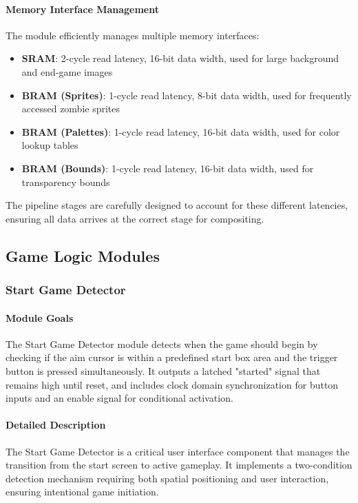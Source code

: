 \documentclass[12pt,a4paper]{article}
\begin{document}
\paragraph{Memory Interface Management}
The module efficiently manages multiple memory interfaces:
\begin{itemize}
    \item \textbf{SRAM}: 2-cycle read latency, 16-bit data width, used for large background and end-game images
    \item \textbf{BRAM (Sprites)}: 1-cycle read latency, 8-bit data width, used for frequently accessed zombie sprites
    \item \textbf{BRAM (Palettes)}: 1-cycle read latency, 16-bit data width, used for color lookup tables
    \item \textbf{BRAM (Bounds)}: 1-cycle read latency, 16-bit data width, used for transparency bounds
\end{itemize}

The pipeline stages are carefully designed to account for these different latencies, ensuring all data arrives at the correct stage for compositing.

\subsection{Game Logic Modules}
\subsubsection{Start Game Detector}

\paragraph{Module Goals}
The Start Game Detector module detects when the game should begin by checking if the aim cursor is within a predefined start box area and the trigger button is pressed simultaneously. It outputs a latched "started" signal that remains high until reset, and includes clock domain synchronization for button inputs and an enable signal for conditional activation.

\paragraph{Detailed Description}
The Start Game Detector is a critical user interface component that manages the transition from the start screen to active gameplay. It implements a two-condition detection mechanism requiring both spatial positioning and user interaction, ensuring intentional game initiation.
\end{document}
